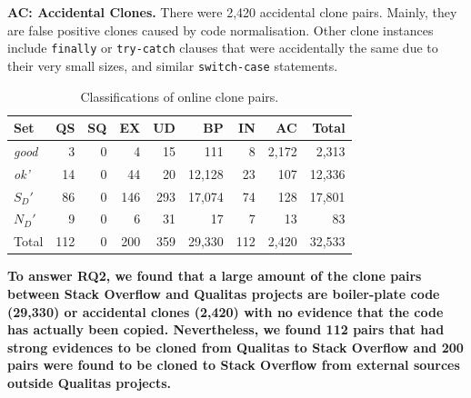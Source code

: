 \documentclass[sigconf,review, anonymous]{acmart}
\begin{document}
\textbf{AC: Accidental Clones.} There were 2,420 accidental clone
pairs. Mainly, they are false positive clones caused by code
normalisation. 
Other clone instances include {\small\texttt{finally}} or
{\small\texttt{try-catch}} clauses that were accidentally the same due
to their very small sizes, and similar {\small\texttt{switch-case}}
statements.

\begin{table}
	\centering
	\caption{Classifications of online clone pairs.}
	\label{tab:classification_good_o}
		\begin{tabular}{l|rrrr|rrr|r}
			\hline
			Set & QS & SQ & EX & UD & BP & IN & AC & Total \\ 
			\hline
			\multirow{1}{*}{\textit{good}}  & 3 & 0 & 4 & 15 & 111  & 8 & 2,172 & 2,313 \\
			\multirow{1}{*}{\textit{ok'}}  & 14 & 0 & 44 & 20 & 12,128 & 23 & 107 & 12,336 \\
			\multirow{1}{*}{$S_D'$} & 86 & 0 & 146 & 293 & 17,074 & 74 & 128 & 17,801 \\
			\multirow{1}{*}{$N_D'$} & 9  & 0  & 6 & 31 & 17 & 7 & 13 & 83 \\ 
			\hline
			Total & 112 & 0 & 200 & 359 & 29,330 & 112 & 2,420 & 32,533 \\ 
			\hline
		\end{tabular} 
\end{table}


\textbf{To answer RQ2, we found that a large amount of the clone pairs
  between Stack Overflow and Qualitas projects are boiler-plate code
  (29,330) or accidental clones (2,420) with no evidence that the code
  has actually been copied. Nevertheless, we found 112 pairs that had
  strong evidences to be cloned from Qualitas to Stack Overflow and
  200 pairs were found to be cloned to Stack Overflow from external
  sources outside Qualitas projects.} 
\end{document}

